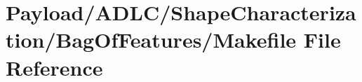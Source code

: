 \hypertarget{Payload_2ADLC_2ShapeCharacterization_2BagOfFeatures_2Makefile}{\section{Payload/\-A\-D\-L\-C/\-Shape\-Characterization/\-Bag\-Of\-Features/\-Makefile File Reference}
\label{Payload_2ADLC_2ShapeCharacterization_2BagOfFeatures_2Makefile}
}
